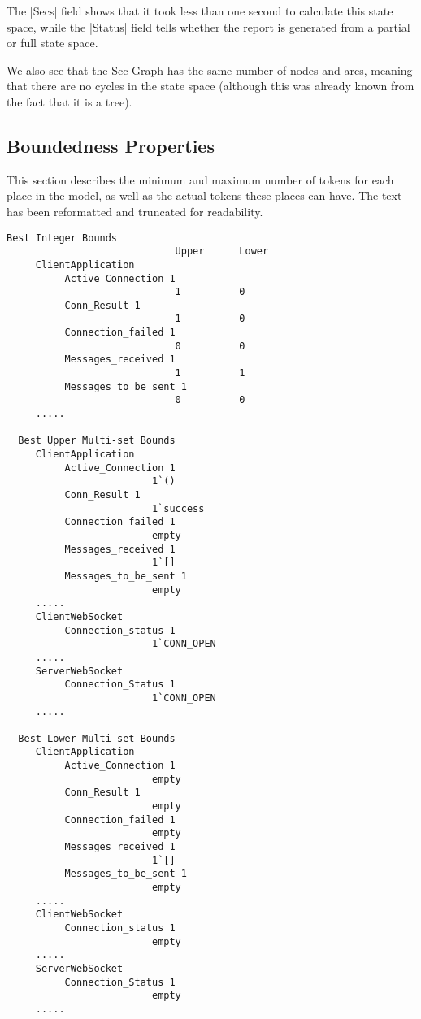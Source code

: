 	The |Secs| field shows that it took less than one second to calculate this
	state space, while the |Status| field tells whether the report is generated
	from a partial or full state space.
	
	We also see that the Scc Graph has the same number of nodes and arcs, meaning
	that there are no cycles in the state space (although this was already known
	from the fact that it is a tree).
	
	\subsection{Boundedness Properties}
	This section describes the minimum and maximum number of tokens for
	each place in the model, as well as the actual tokens these places can have.
	The text has been reformatted and truncated for readability.
	\begin{lstlisting}[language={}]
  Best Integer Bounds
                             Upper      Lower
     ClientApplication
          Active_Connection 1
                             1          0
          Conn_Result 1
                             1          0
          Connection_failed 1
                             0          0
          Messages_received 1
                             1          1
          Messages_to_be_sent 1
                             0          0
     .....

  Best Upper Multi-set Bounds
     ClientApplication
          Active_Connection 1
                         1`()
          Conn_Result 1
                         1`success
          Connection_failed 1
                         empty
          Messages_received 1
                         1`[]
          Messages_to_be_sent 1
                         empty
     .....
     ClientWebSocket
          Connection_status 1
                         1`CONN_OPEN
     .....
     ServerWebSocket
          Connection_Status 1
                         1`CONN_OPEN
     .....

  Best Lower Multi-set Bounds
     ClientApplication
          Active_Connection 1
                         empty
          Conn_Result 1
                         empty
          Connection_failed 1
                         empty
          Messages_received 1
                         1`[]
          Messages_to_be_sent 1
                         empty
     .....
     ClientWebSocket
          Connection_status 1
                         empty
     .....
     ServerWebSocket
          Connection_Status 1
                         empty
     .....
	\end{lstlisting}
	
